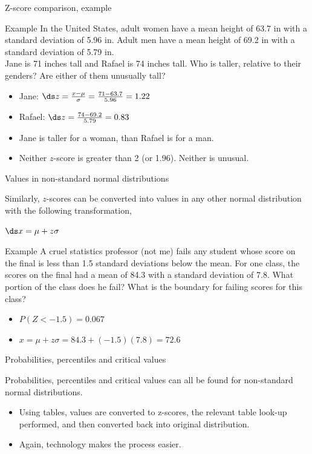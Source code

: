 \documentclass[xcolor=table]{beamer}
\begin{document}
\begin{frame}{Z-score comparison, example}
\begin{exampleblock}{Example}
In the United States, adult women have a mean height of 63.7 in with a standard deviation of 5.96 in. Adult men have a mean height of 69.2 in with a standard deviation of 5.79 in.\\
\medskip
Jane is 71 inches tall and Rafael is 74 inches tall. Who is taller, relative to their genders? Are either of them unusually tall?
\begin{itemize}
\pause\item Jane: $\ds z = \frac {x - \mu}{\sigma} = \frac {71 - 63.7}{5.96} = 1.22$
\pause\item Rafael: $\ds z = \frac {74 - 69.2}{5.79} = 0.83$
\pause\item Jane is taller for a woman, than Rafael is for a man.
\pause\item Neither $z$-score is greater than 2 (or 1.96). Neither is unusual.
\end{itemize}
\end{exampleblock}
\end{frame}

\begin{frame}{Values in non-standard normal distributions}
\begin{block}{}
Similarly, $z$-scores can be converted into values in any other normal distribution with the following transformation,\\
\smallskip
{\centering
$\ds x = \mu + z \sigma$
\par}
\medskip
\end{block}

\pause
\begin{exampleblock}{Example}
A cruel statistics professor (not me) fails any student whose score on the final is less than 1.5 standard deviations below the mean. For one class, the scores on the final had a mean of 84.3 with a standard deviation of 7.8. What portion of the class does he fail? What is the boundary for failing scores for this class?
\begin{itemize}
\pause\item $P(Z < -1.5) = 0.067$
\pause\item $x = \mu + z \sigma = 84.3 + (-1.5) (7.8) = 72.6$
\end{itemize} 
\end{exampleblock}
\end{frame}

\begin{frame}{Probabilities, percentiles and critical values}
\begin{block}{}
Probabilities, percentiles and critical values can all be found for non-standard normal distributions.
\begin{itemize}
\item Using tables, values are converted to z-scores, the relevant table look-up performed, and then converted back into original distribution.
\item Again, technology makes the process easier.
\end{itemize}
\end{block}
\end{frame}
\end{document}
